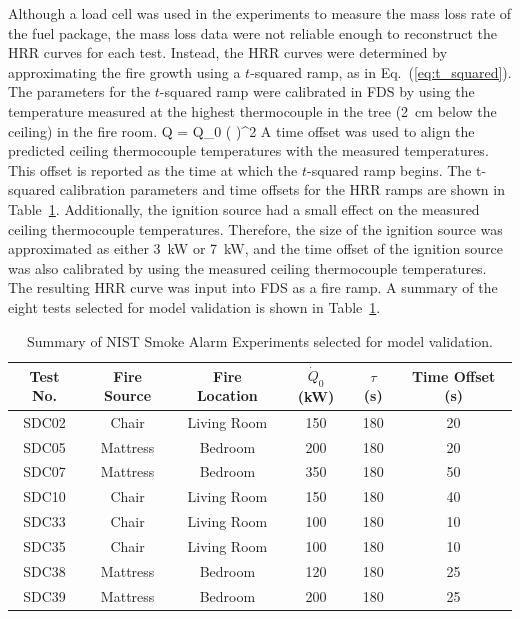 Although a load cell was used in the experiments to measure the mass loss rate of the fuel package, the mass loss data
were not reliable enough to reconstruct the HRR curves for each test. Instead, the HRR curves were determined by approximating
the fire growth using a $t$-squared ramp, as in Eq.~(\ref{eq:t_squared}). The parameters for the $t$-squared ramp were calibrated in FDS
by using the temperature measured at the highest thermocouple in the tree (2~cm below the ceiling) in the fire room.
\be
\dot Q = \dot Q_0 \left(  \right)^2
\label{eq:t_squared}
\ee
A time offset was used to align the predicted ceiling thermocouple temperatures with the measured temperatures.
This offset is reported as the time at which the $t$-squared ramp begins.
The t-squared calibration parameters and time offsets for the HRR ramps are shown in Table~\ref{tab:NIST_Smoke_Alarms_Summary}.
Additionally, the ignition source had a small effect on the measured ceiling thermocouple temperatures. Therefore,
the size of the ignition source was approximated as either 3~kW or 7~kW, and the time offset of the ignition source was
also calibrated by using the measured ceiling thermocouple temperatures. The resulting HRR curve was input into FDS as a fire ramp.
A summary of the eight tests selected for model validation is shown in Table~\ref{tab:NIST_Smoke_Alarms_Summary}.

\begin{table}[h!]
\caption{Summary of NIST Smoke Alarm Experiments selected for model validation.}
\begin{center}
\begin{tabular}{|c|c|c|c|c|c|}
\hline
Test No.  &  Fire Source  &  Fire Location  &  $\dot Q_0$ (kW)  &  $\tau$ (s)  &  Time Offset (s)  \\ \hline \hline
SDC02     &  Chair        &  Living Room    &  150              &  180         &  20               \\ \hline
SDC05     &  Mattress     &  Bedroom        &  200              &  180         &  20               \\ \hline
SDC07     &  Mattress     &  Bedroom        &  350              &  180         &  50               \\ \hline
SDC10     &  Chair        &  Living Room    &  150              &  180         &  40               \\ \hline
SDC33     &  Chair        &  Living Room    &  100              &  180         &  10               \\ \hline
SDC35     &  Chair        &  Living Room    &  100              &  180         &  10               \\ \hline
SDC38     &  Mattress     &  Bedroom        &  120              &  180         &  25               \\ \hline
SDC39     &  Mattress     &  Bedroom        &  200              &  180         &  25               \\ \hline
\end{tabular}
\end{center}
\label{tab:NIST_Smoke_Alarms_Summary}
\end{table}


